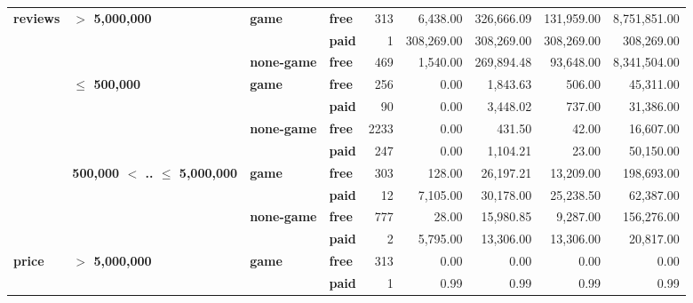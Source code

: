 \begin{tabular}{llll|rrrrr}
\cline{1-9}
\cline{2-9}
\cline{3-9}
\multirow{11}{*}{\textbf{reviews}} & \multirow{3}{*}{\textbf{$>$ 5,000,000}} & \multirow{2}{*}{\textbf{game}} & \textbf{free} &    313 &   6,438.00 & 326,666.09 & 131,959.00 & 8,751,851.00 \\
      &                                 &           & \textbf{paid} &      1 & 308,269.00 & 308,269.00 & 308,269.00 &   308,269.00 \\
\cline{3-9}
      &                                 & \textbf{none-game} & \textbf{free} &    469 &   1,540.00 & 269,894.48 &  93,648.00 & 8,341,504.00 \\
\cline{2-9}
      & \multirow{4}{*}{\textbf{$\leq$ 500,000}} & \multirow{2}{*}{\textbf{game}} & \textbf{free} &    256 &       0.00 &   1,843.63 &     506.00 &    45,311.00 \\
      &                                 &           & \textbf{paid} &     90 &       0.00 &   3,448.02 &     737.00 &    31,386.00 \\
\cline{3-9}
      &                                 & \multirow{2}{*}{\textbf{none-game}} & \textbf{free} &   2233 &       0.00 &     431.50 &      42.00 &    16,607.00 \\
      &                                 &           & \textbf{paid} &    247 &       0.00 &   1,104.21 &      23.00 &    50,150.00 \\
\cline{2-9}
\cline{3-9}
      & \multirow{4}{*}{\textbf{500,000 $<$ .. $\leq$ 5,000,000}} & \multirow{2}{*}{\textbf{game}} & \textbf{free} &    303 &     128.00 &  26,197.21 &  13,209.00 &   198,693.00 \\
      &                                 &           & \textbf{paid} &     12 &   7,105.00 &  30,178.00 &  25,238.50 &    62,387.00 \\
\cline{3-9}
      &                                 & \multirow{2}{*}{\textbf{none-game}} & \textbf{free} &    777 &      28.00 &  15,980.85 &   9,287.00 &   156,276.00 \\
      &                                 &           & \textbf{paid} &      2 &   5,795.00 &  13,306.00 &  13,306.00 &    20,817.00 \\
\cline{1-9}
\cline{2-9}
\cline{3-9}
\multirow{11}{*}{\textbf{price}} & \multirow{3}{*}{\textbf{$>$ 5,000,000}} & \multirow{2}{*}{\textbf{game}} & \textbf{free} &    313 &       0.00 &       0.00 &       0.00 &         0.00 \\
      &                                 &           & \textbf{paid} &      1 &       0.99 &       0.99 &       0.99 &         0.99 \\

\end{tabular}
